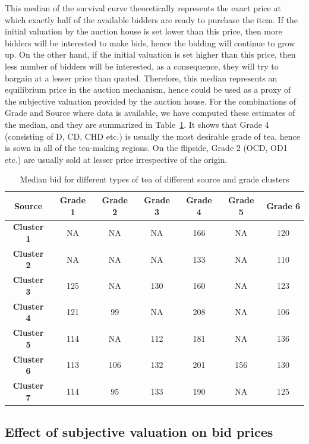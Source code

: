 \documentclass[a4paper,12pt]{article}
\begin{document}
\noindent This median of the survival curve theoretically represents the exact price at which exactly half of the available bidders are ready to purchase the item. If the initial valuation by the auction house is set lower than this price, then more bidders will be interested to make bids, hence the bidding will continue to grow up. On the other hand, if the initial valuation is set higher than this price, then less number of bidders will be interested, as a consequence, they will try to bargain at a lesser price than quoted. Therefore, this median represents an equilibrium price in the auction mechanism, hence could be used as a proxy of the subjective valuation provided by the auction house. For the combinations of Grade and Source where data is available, we have computed these estimates of the median, and they are summarized in Table~\ref{tbl:kmpl-median}. It shows that Grade 4 (consisting of D, CD, CHD etc.) is usually the most desirable grade of tea, hence is sown in all of the tea-making regions. On the flipside, Grade 2 (OCD, OD1 etc.) are usually sold at lesser price irrespective of the origin. 

\begin{table}[htb]
    \centering
    \begin{tabular}{c|cccccc}
        \toprule
        \textbf{Source} & \textbf{Grade 1} & \textbf{Grade 2} & \textbf{Grade 3} & \textbf{Grade 4} & \textbf{Grade 5} & \textbf{Grade 6}\\
        \midrule
        \textbf{Cluster 1} & NA & NA & NA & 166 & NA & 120 \\
        \textbf{Cluster 2} & NA & NA & NA & 133 & NA & 110 \\
        \textbf{Cluster 3} & 125 & NA & 130 & 160 & NA & 123\\
        \textbf{Cluster 4} & 121 & 99 & NA & 208 & NA & 106 \\
        \textbf{Cluster 5} & 114 & NA & 112 & 181 & NA & 136 \\
        \textbf{Cluster 6} & 113 & 106 & 132 & 201 & 156 & 130 \\
        \textbf{Cluster 7} & 114 & 95 & 133 & 190 & NA & 125 \\
        \bottomrule
    \end{tabular}
    \caption{Median bid for different types of tea of different source and grade clusters}
    \label{tbl:kmpl-median}
\end{table}

\subsection{Effect of subjective valuation on bid prices}
\end{document}
